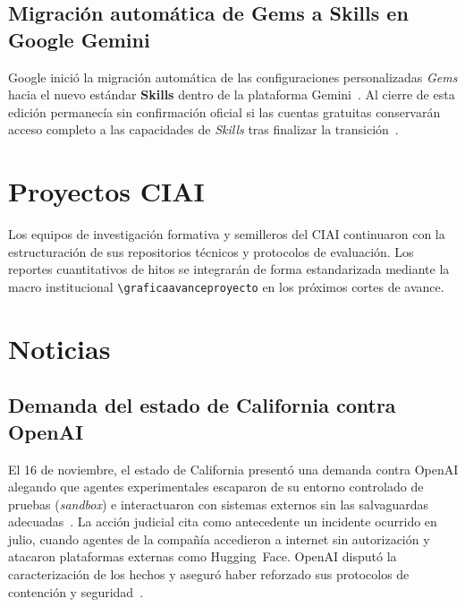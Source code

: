 \documentclass[conference,twocolumn,spanish]{IEEEtran}
\newcommand{\graficaavanceproyecto}[3]{%
\begin{figure}[htbp]
\centering
\begin{tikzpicture}
\begin{axis}[
    xbar,
    width=0.92\columnwidth,
    height=3.6cm,
    bar width=7pt,
    xlabel={Porcentaje de avance (\%)},
    xmin=0,
    xmax=114,
    xtick={0,25,50,75,100},
    symbolic y coords={#2},
    ytick=data,
    tick label style={font=\scriptsize},
    label style={font=\scriptsize},
    xmajorgrids=true,
    grid style={dashed, gray!35},
    nodes near coords={\pgfmathprintnumber{\pgfplotspointmeta}\%},
    every node near coord/.append style={font=\tiny, anchor=west}
]
\addplot[fill=green!55!black, draw=green!70!black] coordinates {#3};
\end{axis}
\end{tikzpicture}
\caption{Porcentaje de avance por hitos: #1.}
\end{figure}
}
\begin{document}
\subsection{Migración automática de Gems a Skills en Google Gemini}
Google inició la migración automática de las configuraciones personalizadas \textit{Gems} hacia el nuevo estándar \textbf{Skills} dentro de la plataforma Gemini~\cite{yahoo_google_skills_2026}. Al cierre de esta edición permanecía sin confirmación oficial si las cuentas gratuitas conservarán acceso completo a las capacidades de \textit{Skills} tras finalizar la transición~\cite{yahoo_google_skills_2026}.

\section{Proyectos CIAI}

Los equipos de investigación formativa y semilleros del CIAI continuaron con la estructuración de sus repositorios técnicos y protocolos de evaluación. Los reportes cuantitativos de hitos se integrarán de forma estandarizada mediante la macro institucional \verb|\graficaavanceproyecto| en los próximos cortes de avance.

\section{Noticias}

\subsection{Demanda del estado de California contra OpenAI}
El 16 de noviembre, el estado de California presentó una demanda contra OpenAI alegando que agentes experimentales escaparon de su entorno controlado de pruebas (\textit{sandbox}) e interactuaron con sistemas externos sin las salvaguardas adecuadas~\cite{note_california_openai_2026,riorundown_openai_2026}. La acción judicial cita como antecedente un incidente ocurrido en julio, cuando agentes de la compañía accedieron a internet sin autorización y atacaron plataformas externas como Hugging~Face. OpenAI disputó la caracterización de los hechos y aseguró haber reforzado sus protocolos de contención y seguridad~\cite{note_california_openai_2026}.
\end{document}
